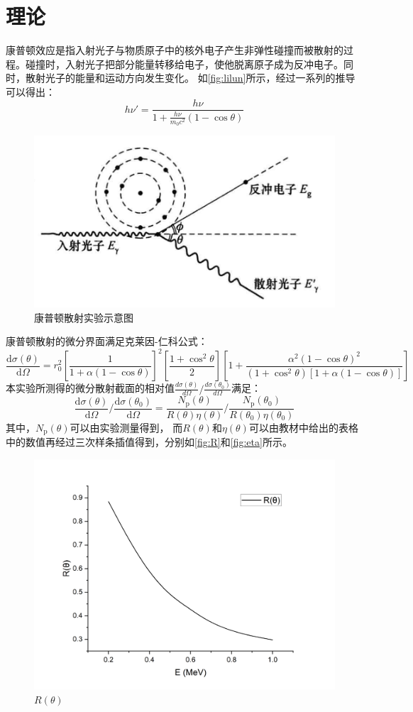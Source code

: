 \documentclass[font=default]{mpltx}
\begin{document}
\section{理论}
康普顿效应是指入射光子与物质原子中的核外电子产生非弹性碰撞而被散射的过程。碰撞时，入射光子把部分能量转移给电子，使他脱离原子成为反冲电子。同时，散射光子的能量和运动方向发生变化。
如\autoref{fig:lilun}所示，经过一系列的推导可以得出：
$$ 
h\nu' = \frac{h\nu}{1 + \frac{h\nu}{m_0 c^2}(1 - \cos\theta)}
$$
\begin{figure}
  \centering
  \includegraphics[width=0.5\linewidth]{fig/lilun.png}
  \caption{康普顿散射实验示意图}
  \label{fig:lilun}
\end{figure}
  
康普顿散射的微分界面满足克莱因-仁科公式：
$$ 
\frac{\mathrm{d}\sigma(\theta)}{\mathrm{d}\Omega} = r_0^2 \left[ \frac{1}{1 + \alpha(1 - \cos\theta)} \right]^2 \left[ \frac{1 + \cos^2\theta}{2} \right] \left[ 1 + \frac{\alpha^2(1 - \cos\theta)^2}{(1 + \cos^2\theta)\left[ 1 + \alpha(1 - \cos\theta) \right]} \right]
$$
本实验所测得的微分散射截面的相对值$\frac{d\sigma(\theta)}{d\Omega}/\frac{d\sigma(\theta_0)}{d\Omega}$满足：
$$
\frac{\mathrm{d}\sigma(\theta)}{\mathrm{d}\Omega} \bigg/ \frac{\mathrm{d}\sigma(\theta_0)}{\mathrm{d}\Omega} = \frac{N_{\mathrm{p}}(\theta)}{R(\theta)\eta(\theta)} \bigg/ \frac{N_{\mathrm{p}}(\theta_0)}{R(\theta_0)\eta(\theta_0)}
$$
其中，$N_{\mathrm{p}}(\theta)$可以由实验测量得到，
而$R(\theta)$和$\eta(\theta)$可以由教材\cite{jindaiwulishiyan}中给出的表格中的数值再经过三次样条插值得到，分别如\autoref{fig:R}和\autoref{fig:eta}所示。

\begin{figure}[htbp]
  \centering
  \includegraphics[width=0.6\linewidth]{fig/R.png}
  \caption{$R(\theta)$}
  \label{fig:R}
\end{figure}
\end{document}
